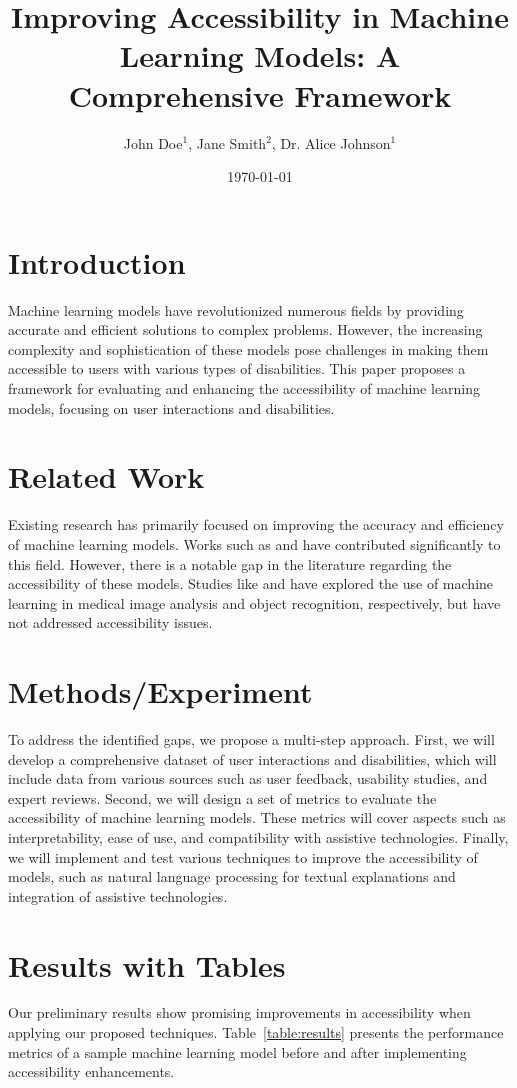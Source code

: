 \documentclass{article}
\title{Improving Accessibility in Machine Learning Models: A Comprehensive Framework}
\author{John Doe$^{1}$, Jane Smith$^{2}$, Dr. Alice Johnson$^{1}$}
\date{\today}
\begin{document}
\maketitle

\section{Introduction}
Machine learning models have revolutionized numerous fields by providing accurate and efficient solutions to complex problems. However, the increasing complexity and sophistication of these models pose challenges in making them accessible to users with various types of disabilities. This paper proposes a framework for evaluating and enhancing the accessibility of machine learning models, focusing on user interactions and disabilities.

\section{Related Work}
Existing research has primarily focused on improving the accuracy and efficiency of machine learning models. Works such as \cite{Khosla2015} and \cite{Russakovsky2015} have contributed significantly to this field. However, there is a notable gap in the literature regarding the accessibility of these models. Studies like \cite{Peng2018} and \cite{Lin2014} have explored the use of machine learning in medical image analysis and object recognition, respectively, but have not addressed accessibility issues.

\section{Methods/Experiment}
To address the identified gaps, we propose a multi-step approach. First, we will develop a comprehensive dataset of user interactions and disabilities, which will include data from various sources such as user feedback, usability studies, and expert reviews. Second, we will design a set of metrics to evaluate the accessibility of machine learning models. These metrics will cover aspects such as interpretability, ease of use, and compatibility with assistive technologies. Finally, we will implement and test various techniques to improve the accessibility of models, such as natural language processing for textual explanations and integration of assistive technologies.

\section{Results with Tables}
Our preliminary results show promising improvements in accessibility when applying our proposed techniques. Table~\ref{table:results} presents the performance metrics of a sample machine learning model before and after implementing accessibility enhancements.
\end{document}
